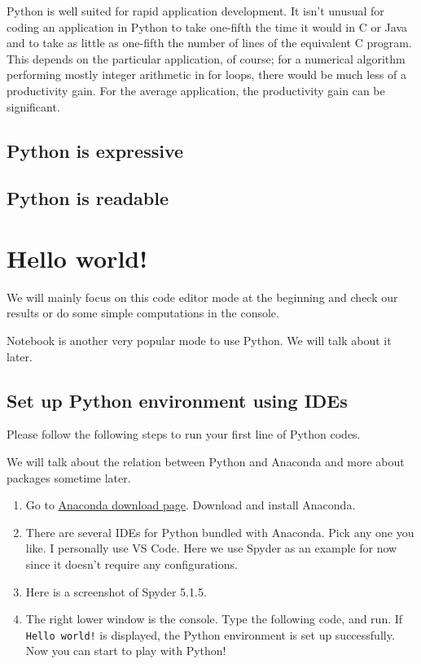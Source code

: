 \documentclass[
]{book}
\begin{document}
Python is well suited for rapid application development. It isn't unusual for coding an application in Python to take one-fifth the time it would in C or Java and to take as little as one-fifth the number of lines of the equivalent C program. This depends on the particular application, of course; for a numerical algorithm performing mostly integer arithmetic in for loops, there would be much less of a productivity gain. For the average application, the productivity gain can be significant.

\hypertarget{python-is-expressive}{%
\subsection{Python is expressive}\label{python-is-expressive}}

\hypertarget{python-is-readable}{%
\subsection{Python is readable}\label{python-is-readable}}

\citet{Klo2021}
\citet{Ram2015}
\citet{Sha2017}
\citet{Sha2017a}
\citet{Ced2018}
\citet{You2020}

\hypertarget{hello-world}{%
\section{Hello world!}\label{hello-world}}

We will mainly focus on this code editor mode at the beginning and check our results or do some simple computations in the console.

Notebook is another very popular mode to use Python. We will talk about it later.

\hypertarget{set-up-python-environment-using-ides}{%
\subsection{Set up Python environment using IDEs}\label{set-up-python-environment-using-ides}}

Please follow the following steps to run your first line of Python codes.

We will talk about the relation between Python and Anaconda and more about packages sometime later.

\begin{enumerate}
\def\labelenumi{\arabic{enumi}.}
\item
  Go to \href{https://www.anaconda.com/}{Anaconda download page}. Download and install Anaconda.
\item
  There are several IDEs for Python bundled with Anaconda. Pick any one you like. I personally use VS Code. Here we use Spyder as an example for now since it doesn't require any configurations.
\item
  Here is a screenshot of Spyder 5.1.5.
\item
  The right lower window is the console. Type the following code, and run. If \texttt{Hello\ world!} is displayed, the Python environment is set up successfully. Now you can start to play with Python!
\end{enumerate}
\end{document}
